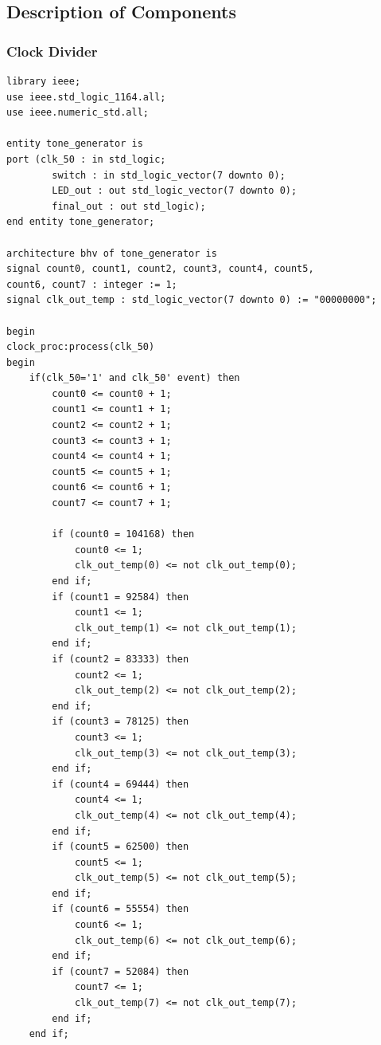 \documentclass[12pt]{article}
\begin{document}
\subsection{Description of Components}
\subsubsection{Clock Divider}
\begin{verbatim}
library ieee;
use ieee.std_logic_1164.all;
use ieee.numeric_std.all;

entity tone_generator is
port (clk_50 : in std_logic;
		switch : in std_logic_vector(7 downto 0);
		LED_out : out std_logic_vector(7 downto 0);
		final_out : out std_logic);
end entity tone_generator;

architecture bhv of tone_generator is
signal count0, count1, count2, count3, count4, count5, 
count6, count7 : integer := 1;
signal clk_out_temp : std_logic_vector(7 downto 0) := "00000000";

begin
clock_proc:process(clk_50)
begin
	if(clk_50='1' and clk_50' event) then
		count0 <= count0 + 1;
		count1 <= count1 + 1;
		count2 <= count2 + 1;
		count3 <= count3 + 1;
		count4 <= count4 + 1;
		count5 <= count5 + 1;
		count6 <= count6 + 1;
		count7 <= count7 + 1;
	
		if (count0 = 104168) then
			count0 <= 1;
			clk_out_temp(0) <= not clk_out_temp(0);
		end if;
		if (count1 = 92584) then
			count1 <= 1;
			clk_out_temp(1) <= not clk_out_temp(1);
		end if;
		if (count2 = 83333) then
			count2 <= 1;
			clk_out_temp(2) <= not clk_out_temp(2);
		end if;
		if (count3 = 78125) then
			count3 <= 1;
			clk_out_temp(3) <= not clk_out_temp(3);
		end if;
		if (count4 = 69444) then
			count4 <= 1;
			clk_out_temp(4) <= not clk_out_temp(4);
		end if;
		if (count5 = 62500) then
			count5 <= 1;
			clk_out_temp(5) <= not clk_out_temp(5);
		end if;
		if (count6 = 55554) then
			count6 <= 1;
			clk_out_temp(6) <= not clk_out_temp(6);
		end if;
		if (count7 = 52084) then
			count7 <= 1;
			clk_out_temp(7) <= not clk_out_temp(7);
		end if;
	end if;
	

\end{verbatim}
\end{document}
